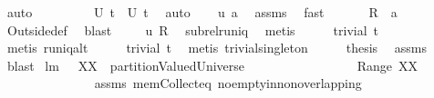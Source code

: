 \begin{isabellebody}
\ auto\isanewline
\ \ \isamarkupfalse%
\ \isamarkupfalse%
\ \isanewline
\ \ {}{\isacharcolon}\ {\isachardoublequoteopen}{\isacharquery}U\ {\isacharquery}t{}\ {\isasymsubseteq}\ {\isacharquery}U\ {\isacharquery}t{}{\isachardoublequoteclose}\ \isamarkupfalse%
\ auto\isanewline
\ \ \isamarkupfalse%
\ {\isachardoublequoteopen}{\isacharquery}u\ a{\isachardoublequoteclose}\ \isamarkupfalse%
\ assms\ \isamarkupfalse%
\ fast\ \isanewline
\ \ \isamarkupfalse%
\ \isamarkupfalse%
\ {\isachardoublequoteopen}{\isacharquery}R\ {\isasymsubseteq}\ a{\isachardoublequoteclose}\ \isamarkupfalse%
\ Outside{\isacharunderscore}def\ \isamarkupfalse%
\ blast\ \isamarkupfalse%
\isanewline
\ \ \isamarkupfalse%
\ {\isachardoublequoteopen}{\isacharquery}u\ {\isacharquery}R{\isachardoublequoteclose}\ \isamarkupfalse%
\ subrel{\isacharunderscore}runiq\ \isamarkupfalse%
\ metis\isanewline
\ \ \isamarkupfalse%
\ \isamarkupfalse%
\ {\isachardoublequoteopen}trivial\ {\isacharquery}t{}{\isachardoublequoteclose}\ \isamarkupfalse%
\ {\isacharparenleft}metis\ runiq{\isacharunderscore}alt{\isacharparenright}\isanewline
\ \ \isamarkupfalse%
\ \isamarkupfalse%
\ {\isachardoublequoteopen}trivial\ {\isacharquery}t{}{\isachardoublequoteclose}\ \isamarkupfalse%
\ {\isacharparenleft}metis\ trivial{\isacharunderscore}singleton{\isacharparenright}\isanewline
\ \ \isamarkupfalse%
\ \isamarkupfalse%
\ {\isacharquery}thesis\ \isamarkupfalse%
\ assms\ {}\ \isamarkupfalse%
\ blast\isanewline
{}\isamarkupfalse%
%
\endisatagproof
{\isafoldproof}%
%
\isadelimproof
\isanewline
%
\endisadelimproof
{}\isamarkupfalse%
\ lm{}{}{\isacharcolon}\ \ \ {\isachardoublequoteopen}XX\ {\isasymin}\ partitionValuedUniverse{\isachardoublequoteclose}\ \isanewline
\ \ \ \ \ \ \ \ \ \ \ \ \ \ {\isachardoublequoteopen}{\isacharbraceleft}{\isacharbraceright}\ {\isasymnotin}\ Range\ XX{\isachardoublequoteclose}\ \isanewline
%
\isadelimproof
\ \ \ \ \ \ \ \ \ \ \ \ \ %
\endisadelimproof
%
\isatagproof
{}\isamarkupfalse%
\ assms\ mem{\isacharunderscore}Collect{\isacharunderscore}eq\ no{\isacharunderscore}empty{\isacharunderscore}in{\isacharunderscore}non{\isacharunderscore}overlapping\ \isamarkupfalse%

\end{isabellebody}
